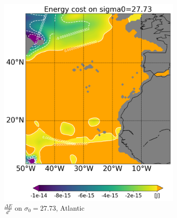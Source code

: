 \begin{figure}[htbp]
\begin{subfigure}[b]{0.4\textwidth}
         \includegraphics[width=\textwidth]{plots/energy/atlantic_energy/Map2dcyl_neg_energy_on_sigma0_2773e-2_reg310Eto360E05Nto57N_1990to1998av_WOCE.png}
         \caption{$\frac{\Delta E}{d^2}$ on $\sigma_0 = 27.73$, Atlantic}
         \label{fig:subplot_atlantic_neg_energy_sigma_0}
     \end{subfigure}
     \hfill
     \begin{subfigure}[b]{0.4\textwidth}
         

\end{subfigure}
\end{figure}
